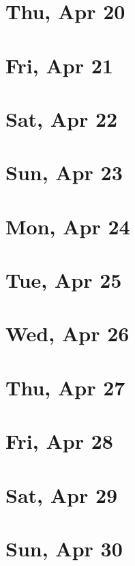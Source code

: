 	\section{Thu, Apr 20}
		
		
	\section{Fri, Apr 21}
		
		
	\section{Sat, Apr 22}
		
		
	\section{Sun, Apr 23}
		
		
	\section{Mon, Apr 24}
		
		
	\section{Tue, Apr 25}
		
		
	\section{Wed, Apr 26}
		
		
	\section{Thu, Apr 27}
		
		
	\section{Fri, Apr 28}
		
		
	\section{Sat, Apr 29}
		
		
	\section{Sun, Apr 30}
		
		
